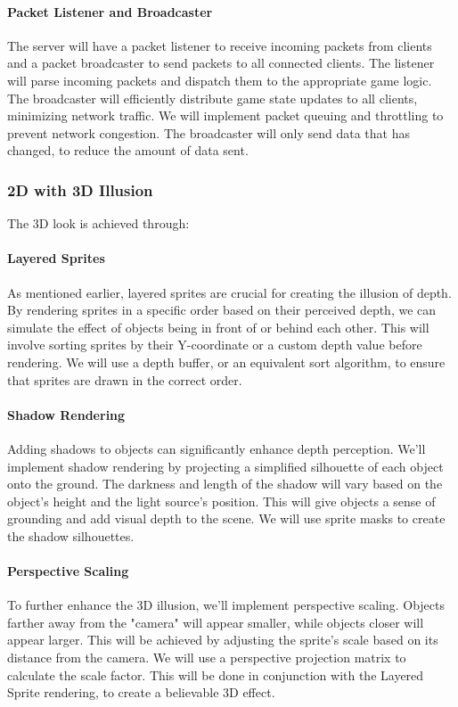\documentclass{article}
\begin{document}
\paragraph{Packet Listener and Broadcaster}
The server will have a packet listener to receive incoming packets from clients and a packet broadcaster to send packets to all connected clients. The listener will parse incoming packets and dispatch them to the appropriate game logic. The broadcaster will efficiently distribute game state updates to all clients, minimizing network traffic. We will implement packet queuing and throttling to prevent network congestion. The broadcaster will only send data that has changed, to reduce the amount of data sent.

\subsubsection{2D with 3D Illusion}

The 3D look is achieved through:

\paragraph{Layered Sprites}
As mentioned earlier, layered sprites are crucial for creating the illusion of depth. By rendering sprites in a specific order based on their perceived depth, we can simulate the effect of objects being in front of or behind each other. This will involve sorting sprites by their Y-coordinate or a custom depth value before rendering. We will use a depth buffer, or an equivalent sort algorithm, to ensure that sprites are drawn in the correct order.

\paragraph{Shadow Rendering}
Adding shadows to objects can significantly enhance depth perception. We'll implement shadow rendering by projecting a simplified silhouette of each object onto the ground. The darkness and length of the shadow will vary based on the object's height and the light source's position. This will give objects a sense of grounding and add visual depth to the scene. We will use sprite masks to create the shadow silhouettes.

\paragraph{Perspective Scaling}
To further enhance the 3D illusion, we'll implement perspective scaling. Objects farther away from the "camera" will appear smaller, while objects closer will appear larger. This will be achieved by adjusting the sprite's scale based on its distance from the camera. We will use a perspective projection matrix to calculate the scale factor. This will be done in conjunction with the Layered Sprite rendering, to create a believable 3D effect.
\end{document}

